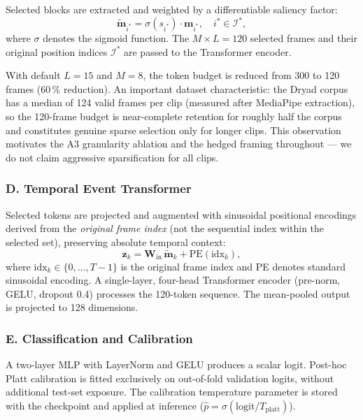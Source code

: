 \documentclass[a4paper,fleqn]{cas-sc}
\begin{document}
Selected blocks are extracted and weighted by a differentiable saliency factor:
\begin{equation}
  \tilde{\mathbf{m}}_{i^*} = \sigma(s_{i^*}) \cdot \mathbf{m}_{i^*},
  \quad i^* \in \mathcal{I}^*,
  \label{eq:sal_weight}
\end{equation}
where $\sigma$ denotes the sigmoid function.
The $M \times L = 120$ selected frames and their original position indices
$\mathcal{I}^*$ are passed to the Transformer encoder.

With default $L=15$ and $M=8$, the token budget is reduced from 300 to 120
frames (60\,\% reduction).
An important dataset characteristic: the Dryad corpus has a median of 124 valid
frames per clip (measured after MediaPipe extraction), so the 120-frame budget
is near-complete retention for roughly half the corpus and constitutes genuine
sparse selection only for longer clips.
This observation motivates the A3 granularity ablation
and the hedged framing throughout --- we do not claim aggressive sparsification
for all clips.

\subsubsection{D. Temporal Event Transformer}

Selected tokens are projected and augmented with sinusoidal positional
encodings derived from the \textit{original frame index} (not the sequential
index within the selected set), preserving absolute temporal context:
\begin{equation}
  \mathbf{z}_k = \mathbf{W}_\text{in}\,\tilde{\mathbf{m}}_{k}
                 + \text{PE}(\text{idx}_k),
  \label{eq:pos_enc}
\end{equation}
where $\text{idx}_k \in \{0,\ldots,T{-}1\}$ is the original frame index and
PE denotes standard sinusoidal encoding.
A single-layer, four-head Transformer encoder (pre-norm, GELU, dropout 0.4)
processes the 120-token sequence.
The mean-pooled output is projected to 128 dimensions.

\subsubsection{E. Classification and Calibration}

A two-layer MLP with LayerNorm and GELU produces a scalar logit.
Post-hoc Platt calibration is fitted exclusively on out-of-fold validation
logits, without additional test-set exposure.
The calibration temperature parameter is stored with the checkpoint and applied
at inference ($\hat{p} = \sigma(\text{logit} / T_\text{platt})$).
\end{document}
